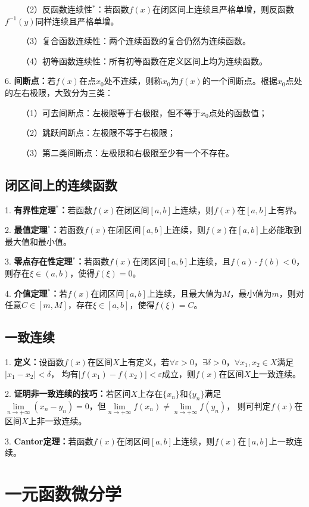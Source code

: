 ~~~~（2）反函数连续性$^*$：若函数$f(x)$在闭区间上连续且严格单增，则反函数$f^{-1}(y)$同样连续且严格单增。

~~~~（3）复合函数连续性：两个连续函数的复合仍然为连续函数。

~~~~（4）初等函数连续性：所有初等函数在定义区间上均为连续函数。

6. \textbf{间断点：}若$f(x)$在点$x_0$处不连续，则称$x_0$为$f(x)$的一个间断点。根据$x_0$点处的左右极限，大致分为三类：

~~~~（1）可去间断点：左极限等于右极限，但不等于$x_0$点处的函数值；

~~~~（2）跳跃间断点：左极限不等于右极限；

~~~~（3）第二类间断点：左极限和右极限至少有一个不存在。

\subsection{闭区间上的连续函数}

1. \textbf{有界性定理$^*$：}若函数$f(x)$在闭区间$[a,b]$上连续，则$f(x)$在$[a,b]$上有界。

2. \textbf{最值定理$^*$：}若函数$f(x)$在闭区间$[a,b]$上连续，则$f(x)$在$[a,b]$上必能取到最大值和最小值。

3. \textbf{零点存在性定理$^*$：}若函数$f(x)$在闭区间$[a,b]$上连续，且$f(a)\cdot f(b)<0$，则存在$\xi \in (a,b)$，使得$f(\xi)=0$。

4. \textbf{介值定理$^*$：}若$f(x)$在闭区间$[a,b]$上连续，且最大值为$M$，最小值为$m$，则对任意$C\in[m,M]$，存在$\xi \in [a,b]$，使得$f(\xi) =C$。

\subsection{一致连续}

1. \textbf{定义：}设函数$f(x)$在区间$X$上有定义，若$\forall \varepsilon>0$，$\exists \delta >0$，$\forall x_1,x_2\in X$满足$\left|x_1-x_2\right|<\delta$，
均有$\left|f(x_1)-f(x_2)\right|<\varepsilon$成立，则$f(x)$在区间$X$上一致连续。

2. \textbf{证明非一致连续的技巧：}若区间$X$上存在$\{x_n\}$和$\{y_n\}$满足$\lim\limits_{n\rightarrow +\infty}\left(x_n-y_n\right)=0$，但$\lim\limits_{n\rightarrow +\infty}f(x_n) \neq \lim\limits_{n\rightarrow +\infty}f(y_n)$，
则可判定$f(x)$在区间$X$上非一致连续。

3. \textbf{Cantor定理：}若函数$f(x)$在闭区间$[a,b]$上连续，则$f(x)$在$[a,b]$上一致连续。

\section{一元函数微分学}

